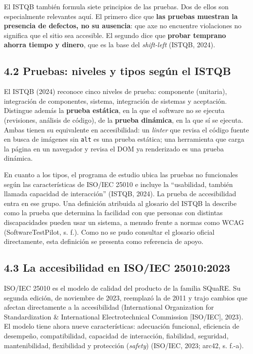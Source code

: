 \documentclass[10pt,letterpaper,onecolumn]{IEEEtran}
\begin{document}
El ISTQB también formula siete principios de las pruebas. Dos de ellos son especialmente relevantes aquí. El primero dice que \textbf{las pruebas muestran la presencia de defectos, no su ausencia}: que axe no encuentre violaciones no significa que el sitio sea accesible. El segundo dice que \textbf{probar temprano ahorra tiempo y dinero}, que es la base del \emph{shift-left} (ISTQB, 2024).

\subsection{4.2 Pruebas: niveles y tipos según el ISTQB}\label{pruebas-niveles-y-tipos-seguxfan-el-istqb}

El ISTQB (2024) reconoce cinco niveles de prueba: componente (unitaria), integración de componentes, sistema, integración de sistemas y aceptación. Distingue además la \textbf{prueba estática}, en la que el software no se ejecuta (revisiones, análisis de código), de la \textbf{prueba dinámica}, en la que sí se ejecuta. Ambas tienen su equivalente en accesibilidad: un \emph{linter} que revisa el código fuente en busca de imágenes sin \texttt{alt} es una prueba estática; una herramienta que carga la página en un navegador y revisa el DOM ya renderizado es una prueba dinámica.

En cuanto a los tipos, el programa de estudio ubica las pruebas no funcionales según las características de ISO/IEC 25010 e incluye la ``usabilidad, también llamada capacidad de interacción'' (ISTQB, 2024). La prueba de accesibilidad entra en ese grupo. Una definición atribuida al glosario del ISTQB la describe como la prueba que determina la facilidad con que personas con distintas discapacidades pueden usar un sistema, a menudo frente a normas como WCAG (SoftwareTestPilot, s. f.). Como no se pudo consultar el glosario oficial directamente, esta definición se presenta como referencia de apoyo.

\subsection{4.3 La accesibilidad en ISO/IEC 25010:2023}\label{la-accesibilidad-en-isoiec-250102023}

ISO/IEC 25010 es el modelo de calidad del producto de la familia SQuaRE. Su segunda edición, de noviembre de 2023, reemplazó la de 2011 y trajo cambios que afectan directamente a la accesibilidad (International Organization for Standardization \& International Electrotechnical Commission {[}ISO/IEC{]}, 2023). El modelo tiene ahora nueve características: adecuación funcional, eficiencia de desempeño, compatibilidad, capacidad de interacción, fiabilidad, seguridad, mantenibilidad, flexibilidad y protección (\emph{safety}) (ISO/IEC, 2023; arc42, s. f.-a).
\end{document}
